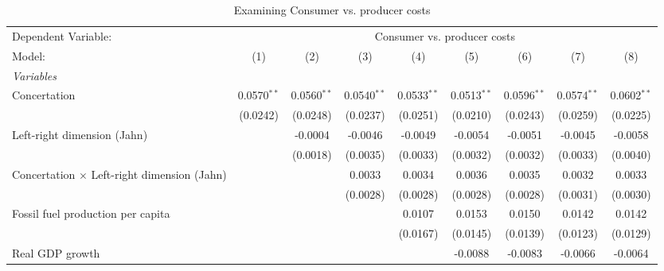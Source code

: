 
\begin{table}[htbp]
   \caption{Examining Consumer vs. producer costs}
   \centering
   \begin{tabular}{lcccccccc}
      \tabularnewline \midrule \midrule
      Dependent Variable: & \multicolumn{8}{c}{Consumer vs. producer costs}\\
      Model:                                             & (1)           & (2)           & (3)           & (4)           & (5)           & (6)           & (7)           & (8)\\  
      \midrule
      \emph{Variables}\\
      Concertation                                       & 0.0570$^{**}$ & 0.0560$^{**}$ & 0.0540$^{**}$ & 0.0533$^{**}$ & 0.0513$^{**}$ & 0.0596$^{**}$ & 0.0574$^{**}$ & 0.0602$^{**}$\\   
                                                         & (0.0242)      & (0.0248)      & (0.0237)      & (0.0251)      & (0.0210)      & (0.0243)      & (0.0259)      & (0.0225)\\   
      Left-right dimension (Jahn)                        &               & -0.0004       & -0.0046       & -0.0049       & -0.0054       & -0.0051       & -0.0045       & -0.0058\\   
                                                         &               & (0.0018)      & (0.0035)      & (0.0033)      & (0.0032)      & (0.0032)      & (0.0033)      & (0.0040)\\   
      Concertation $\times$ Left-right dimension (Jahn)  &               &               & 0.0033        & 0.0034        & 0.0036        & 0.0035        & 0.0032        & 0.0033\\   
                                                         &               &               & (0.0028)      & (0.0028)      & (0.0028)      & (0.0028)      & (0.0031)      & (0.0030)\\   
      Fossil fuel production per capita                  &               &               &               & 0.0107        & 0.0153        & 0.0150        & 0.0142        & 0.0142\\   
                                                         &               &               &               & (0.0167)      & (0.0145)      & (0.0139)      & (0.0123)      & (0.0129)\\   
      Real GDP growth                                    &               &               &               &               & -0.0088       & -0.0083       & -0.0066       & -0.0064\\   

\end{tabular}
\end{table}
